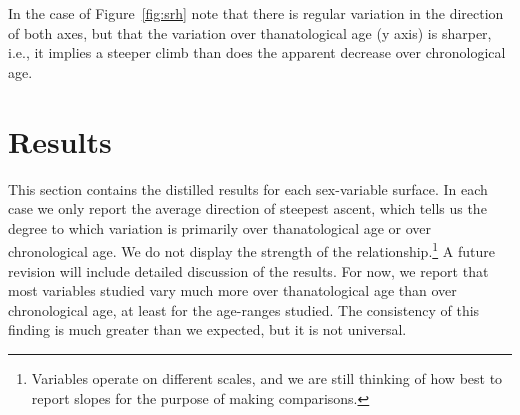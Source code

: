 \documentclass{article}
\begin{document}
In the case of Figure~\ref{fig:srh} note that there is regular variation in the
direction of both axes, but that the variation over thanatological age (y axis)
is sharper, i.e., it implies a steeper climb than does the apparent decrease
over chronological age. 





\section*{Results}
This section contains the distilled results for each sex-variable surface. In
each case we only report the average direction of steepest ascent, which tells
us the degree to which variation is primarily over thanatological age or over
chronological age. We do not display the strength of the
relationship.\footnote{Variables operate on different scales, and we are still
thinking of how best to report slopes for the purpose of making comparisons. }
A future revision will include detailed discussion of the results. For now, we
report that most variables studied vary much more over thanatological age
than over chronological age, at least for the age-ranges studied. The
consistency of this finding is much greater than we expected, but it is not
universal. 
\end{document}

